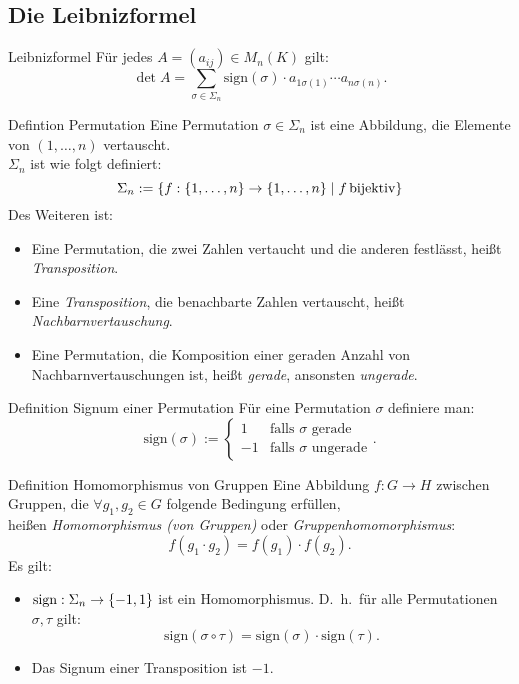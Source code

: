\documentclass[main.tex]{subfiles}
\begin{document}
\subsection*{Die Leibnizformel}

\begin{karte}{Leibnizformel}
    Für jedes \(A = (a_{ij}) \in M_n(K)\) gilt:
    \[\det A = \sum_{\sigma\in\Sigma_n} 
    \text{sign}(\sigma)\cdot a_{1\sigma(1)} \cdots a_{n\sigma(n)}. \]
\end{karte}
\begin{karte}{Defintion Permutation}
    Eine Permutation \(\sigma \in \Sigma_n\) ist eine Abbildung, die 
    Elemente von \((1, \ldots, n)\) vertauscht.\\
    \(\Sigma_n\) ist wie folgt definiert: 
    \[\Sigma_n := \{f: \{1, \ldots ,n\} \rightarrow \{1, \ldots ,n\} 
    \;\vert \; f \operatorname{bijektiv}\}\]
    Des Weiteren ist: 
    \begin{itemize}
        \item Eine Permutation, die zwei Zahlen vertaucht und die 
        anderen festlässt, heißt \textit{Transposition}.
        \item Eine \textit{Transposition}, die benachbarte Zahlen 
        vertauscht, heißt \textit{Nachbarnvertauschung}.
        \item Eine Permutation, die Komposition einer geraden Anzahl 
        von Nachbarnvertauschungen ist, heißt \textit{gerade}, 
        ansonsten \textit{ungerade}.
    \end{itemize}
\end{karte}
\begin{karte}{Definition Signum einer Permutation}
    Für eine Permutation \(\sigma \) definiere man: 
    \[ \text{sign}(\sigma) := \begin{cases}
        1 & \text{falls } \sigma \text{ gerade} \\
        -1 & \text{falls } \sigma \text{ ungerade}
    \end{cases}. \]
\end{karte}
\begin{karte}{Definition Homomorphismus von Gruppen}
    Eine Abbildung \(f: G \rightarrow H\) zwischen Gruppen, die 
    \(\forall g_1,g_2 \in G\) folgende Bedingung erfüllen, \\
    heißen \textit{Homomorphismus (von Gruppen)} oder 
    \textit{Gruppenhomomorphismus}:
    \[f(g_1 \cdot g_2) = f(g_1) \cdot f(g_2).\]
    Es gilt: 
    \begin{itemize}
        \item \(\text{sign}: \Sigma_n \rightarrow \{-1,1\}\) 
        ist ein Homomorphismus.
        D.\ h.\ für alle Permutationen \(\sigma, \tau \) gilt:
        \[\mathrm{sign}(\sigma \circ \tau) = \mathrm{sign}(\sigma) 
        \cdot \mathrm{sign}(\tau).\]
        \item Das Signum einer Transposition ist \(-1\).
    \end{itemize}
\end{karte}
\end{document}
